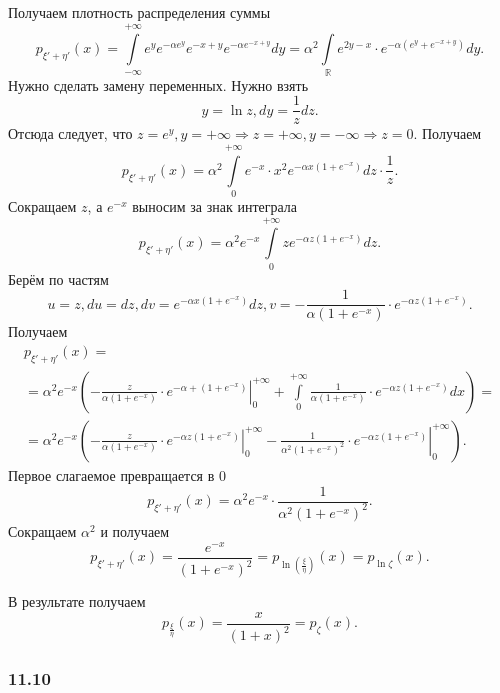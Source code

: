 Получаем плотность распределения суммы
$$p_{ \xi' + \eta'} \left( x \right) =
\int \limits_{- \infty }^{+ \infty } e^y e^{- \alpha e^y} e^{-x+y} e^{- \alpha e^{-x+y}} dy =
\alpha^2 \int \limits_{ \mathbb{R}} e^{2y-x} \cdot e^{- \alpha \left( e^y + e^{-x+y} \right)} dy.$$
Нужно сделать замену переменных.
Нужно взять
$$y = \ln z,
dy = \frac{1}{z}dz.$$
Отсюда следует, что $z = e^y, y = + \infty \Rightarrow z = + \infty, y = - \infty \Rightarrow z = 0$.
Получаем
$$p_{ \xi' + \eta'} \left( x \right) =
\alpha^2 \int \limits_0^{+ \infty } e^{-x} \cdot x^2 e^{- \alpha x \left( 1 + e^{-x} \right) } dz \cdot \frac{1}{z}.$$
Сокращаем $z$, а $e^{-x}$ выносим за знак интеграла
$$p_{ \xi' + \eta'} \left( x \right) =
\alpha^2 e^{-x} \int \limits_0^{+ \infty } ze^{- \alpha z \left( 1 + e^{-x} \right) } dz.$$
Берём по частям
$$u = z,
du = dz,
dv = e^{- \alpha x \left( 1 + e^{-x} \right) } dz,
v = - \frac{1}{ \alpha \left( 1 + e^{-x} \right) } \cdot e^{- \alpha z \left( 1 + e^{-x} \right) }.$$
Получаем
\begin{equation*}
\begin{split}
p_{ \xi' + \eta'} \left( x \right) = \\
= \alpha^2 e^{-x} \left( \left. - \frac{z}{ \alpha \left( 1 + e^{-x} \right) } \cdot e^{- \alpha + \left( 1 + e^{-x} \right) } \right|_0^{+ \infty } +
\int \limits_0^{+ \infty } \frac{1}{ \alpha \left( 1 + e^{-x} \right) } \cdot e^{- \alpha z \left( 1 + e^{-x} \right) } dx \right) = \\
= \alpha^2 e^{-x} \left( \left. - \frac{z}{ \alpha \left( 1 + e^{-x} \right) } \cdot e^{- \alpha z \left( 1 + e^{-x} \right) } \right|_0^{+ \infty } -
\left. \frac{1}{ \alpha^2 \left( 1 + e^{-x} \right)^2 } \cdot e^{- \alpha z \left( 1 + e^{-x} \right)} \right|_0^{+ \infty } \right).
\end{split}
\end{equation*}
Первое слагаемое превращается в 0
$$p_{ \xi' + \eta'} \left( x \right) =
\alpha^2 e^{-x} \cdot \frac{1}{ \alpha^2 \left( 1 + e^{-x} \right) ^2}.$$
Сокращаем $ \alpha^2$ и получаем
$$p_{ \xi' + \eta'} \left( x \right) = \frac{e^{-x}}{ \left( 1 + e^{-x} \right)^2} =
p_{ \ln \left( \frac{ \xi }{ \eta } \right) } \left( x \right) =
p_{ \ln \zeta } \left( x \right).$$

В результате получаем
$$p_{ \frac{ \xi }{ \eta }} \left( x \right) =
\frac{x}{ \left( 1 + x \right)^2} =
p_{ \zeta } \left( x \right).$$

\subsubsection*{11.10}

